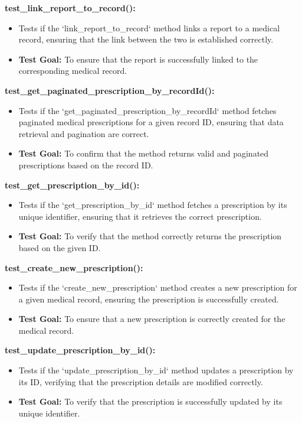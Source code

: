 \documentclass[12pt, titlepage]{article}
\begin{document}
\begin{enumerate}
\textbf{test\_link\_report\_to\_record():}  
\begin{itemize}
    \item Tests if the `link\_report\_to\_record` method links a report to a medical record, ensuring that the link between the two is established correctly.
    \item \textbf{Test Goal:} To ensure that the report is successfully linked to the corresponding medical record.
    \newline
\end{itemize}

\textbf{test\_get\_paginated\_prescription\_by\_recordId():}  
\begin{itemize}
    \item Tests if the `get\_paginated\_prescription\_by\_recordId` method fetches paginated medical prescriptions for a given record ID, ensuring that data retrieval and pagination are correct.
    \item \textbf{Test Goal:} To confirm that the method returns valid and paginated prescriptions based on the record ID.
    \newline
\end{itemize}

\textbf{test\_get\_prescription\_by\_id():}  
\begin{itemize}
    \item Tests if the `get\_prescription\_by\_id` method fetches a prescription by its unique identifier, ensuring that it retrieves the correct prescription.
    \item \textbf{Test Goal:} To verify that the method correctly returns the prescription based on the given ID.
    \newline
\end{itemize}

\textbf{test\_create\_new\_prescription():}  
\begin{itemize}
    \item Tests if the `create\_new\_prescription` method creates a new prescription for a given medical record, ensuring the prescription is successfully created.
    \item \textbf{Test Goal:} To ensure that a new prescription is correctly created for the medical record.
    \newline
\end{itemize}

\textbf{test\_update\_prescription\_by\_id():}  
\begin{itemize}
    \item Tests if the `update\_prescription\_by\_id` method updates a prescription by its ID, verifying that the prescription details are modified correctly.
    \item \textbf{Test Goal:} To verify that the prescription is successfully updated by its unique identifier.
    \newline
\end{itemize}


\end{enumerate}
\end{document}
